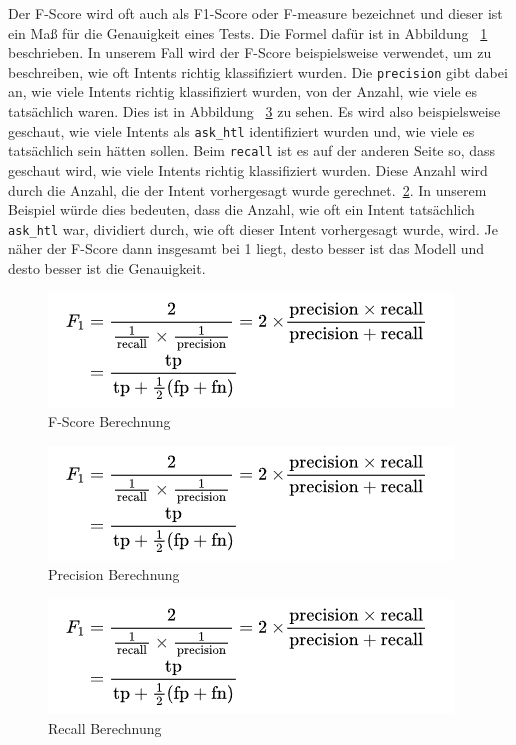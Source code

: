 Der F-Score wird oft auch als F1-Score oder F-measure bezeichnet und dieser ist ein Maß für die Genauigkeit eines Tests.
Die Formel dafür ist in Abbildung ~\ref{fig:f-score} beschrieben.
In unserem Fall wird der F-Score beispielsweise verwendet, um zu beschreiben, wie oft Intents richtig klassifiziert wurden.
Die \texttt{precision} gibt dabei an, wie viele Intents richtig klassifiziert wurden, von der Anzahl, wie viele es tatsächlich waren.
Dies ist in Abbildung ~\ref{fig:precision} zu sehen.
Es wird also beispielsweise geschaut, wie viele Intents als \texttt{ask\_htl} identifiziert wurden und, wie viele es tatsächlich sein hätten sollen.
Beim \texttt{recall} ist es auf der anderen Seite so, dass geschaut wird, wie viele Intents richtig klassifiziert wurden.
Diese Anzahl wird durch die Anzahl, die der Intent vorhergesagt wurde gerechnet.~\ref{fig:recall}.
In unserem Beispiel würde dies bedeuten, dass die Anzahl, wie oft ein Intent tatsächlich \texttt{ask\_htl} war, dividiert durch, wie oft dieser Intent vorhergesagt wurde, wird.
Je näher der F-Score dann insgesamt bei 1 liegt, desto besser ist das Modell und desto besser ist die Genauigkeit.\cite{fScore}

\begin{figure}[hbt!]
    \centering
    \includegraphics[scale=0.75]{pics/f-score}
    \caption{F-Score Berechnung~\cite{fScore}}
    \label{fig:f-score}
\end{figure}

\begin{figure}[hbt!]
    \centering
    \includegraphics[scale=0.75]{pics/f-score}
    \caption{Precision Berechnung~\cite{precisionRecall}}
    \label{fig:recall}
\end{figure}

\begin{figure}[hbt!]
    \centering
    \includegraphics[scale=0.75]{pics/f-score}
    \caption{Recall Berechnung~\cite{precisionRecall}}
    \label{fig:precision}
\end{figure}

